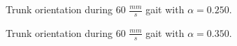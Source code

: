 			\begin{figure}
				\centering
				\caption{Trunk orientation during 60 $\frac{mm}{s}$ gait with $\alpha = 0.250$.}
				\label{fig::narx60_a250_nne}
			\end{figure}
			\begin{figure}
				\centering
				\caption{Trunk orientation during 60 $\frac{mm}{s}$ gait with $\alpha = 0.350$.}
				\label{fig::narx60_a350_nne}
			\end{figure}

